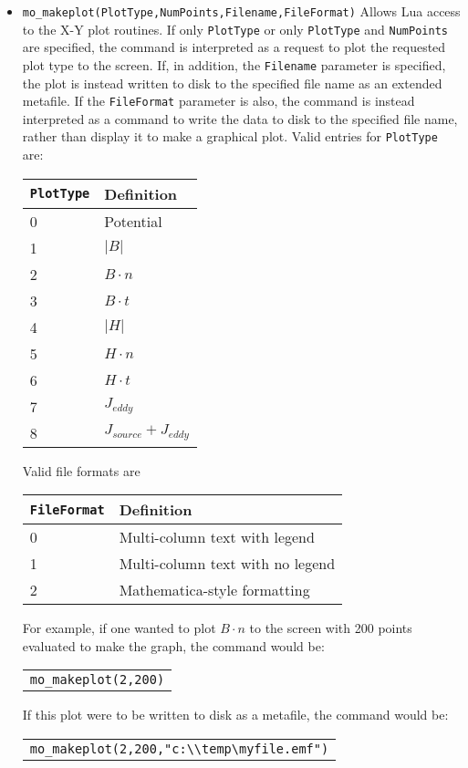 \begin{itemize}
\item \verb+mo_makeplot(PlotType,NumPoints,Filename,FileFormat)+
Allows Lua access to the X-Y plot routines.  If only {\tt PlotType} or only {\tt PlotType}
and {\tt NumPoints} are specified, the command is interpreted as a request to plot the
requested plot type to the screen.  If, in addition, the {\tt Filename} parameter is specified,
the plot is instead written to disk to the specified file name as an extended metafile.
If the {\tt FileFormat} parameter is also, the command is instead interpreted as a command to
write the data to disk to the specified file name, rather than display it to make a
graphical plot.
Valid entries for {\tt PlotType} are:
\begin{center}
\begin{tabular}{ll} \hline
{\tt PlotType} & Definition \\ \hline
0 & Potential \\
1 & $|B|$ \\
2 & $B \cdot n$ \\
3 & $B \cdot t$ \\
4 & $|H|$ \\
5 & $H \cdot n$ \\
6 & $H \cdot t$ \\
7 & $J_{eddy}$ \\
8 & $J_{source}+J_{eddy}$ \\
\hline
\end{tabular}
\end{center}
Valid file formats are
\begin{center}
\begin{tabular}{ll} \hline
{\tt FileFormat} & Definition \\ \hline
0 & Multi-column text with legend \\
1 & Multi-column text with no legend \\
2 & Mathematica-style formatting \\
\hline
\end{tabular}
\end{center}
For example, if one wanted to plot $B \cdot n$ to the screen with 200 points evaluated to
make the graph, the command would be:

\begin{tabular}{l} {\tt mo\_makeplot(2,200)} \end{tabular}

If this plot were to be written to disk as a metafile, the command would be:

\begin{tabular}{l} \verb+mo_makeplot(2,200,"c:\\temp\myfile.emf")+ \end{tabular}


\end{itemize}
